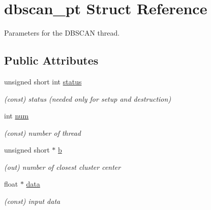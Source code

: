 \hypertarget{structdbscan__pt}{}\section{dbscan\+\_\+pt Struct Reference}
\label{structdbscan__pt}


Parameters for the D\+B\+S\+C\+AN thread.  


\subsection*{Public Attributes}
\begin{DoxyCompactItemize}
\item 
\mbox{\label{structdbscan__pt_a5a42d9fe57034198ed5250f6f0ddb2cb}} 
unsigned short int \mbox{\hyperlink{structdbscan__pt_a5a42d9fe57034198ed5250f6f0ddb2cb}{status}}
\begin{DoxyCompactList}\small\item\em (const) status (needed only for setup and destruction) \end{DoxyCompactList}\item 
\mbox{\label{structdbscan__pt_aaa1b99005b0207af9c85a6fc73368eb3}} 
int \mbox{\hyperlink{structdbscan__pt_aaa1b99005b0207af9c85a6fc73368eb3}{num}}
\begin{DoxyCompactList}\small\item\em (const) number of thread \end{DoxyCompactList}\item 
\mbox{\label{structdbscan__pt_aab10762fb46be396c06f36c7b8f84f64}} 
unsigned short $\ast$ \mbox{\hyperlink{structdbscan__pt_aab10762fb46be396c06f36c7b8f84f64}{b}}
\begin{DoxyCompactList}\small\item\em (out) number of closest cluster center \end{DoxyCompactList}\item 
\mbox{\label{structdbscan__pt_a1da0197a70e570bd30de1872fe60cd6b}} 
float $\ast$ \mbox{\hyperlink{structdbscan__pt_a1da0197a70e570bd30de1872fe60cd6b}{data}}
\begin{DoxyCompactList}\small\item\em (const) input data \end{DoxyCompactList}\item 

\end{DoxyCompactItemize}
